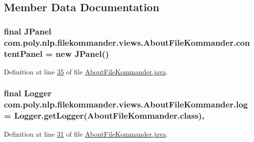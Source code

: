 \subsection{Member Data Documentation}
\hypertarget{classcom_1_1poly_1_1nlp_1_1filekommander_1_1views_1_1_about_file_kommander_ad925c308e870c6d3789d72cdec139c93}{
\subsubsection[{content\-Panel}]{\setlength{\rightskip}{0pt plus 5cm}final J\-Panel com.\-poly.\-nlp.\-filekommander.\-views.\-About\-File\-Kommander.\-content\-Panel = new J\-Panel()\hspace{0.3cm}{\ttfamily [private]}}}\label{classcom_1_1poly_1_1nlp_1_1filekommander_1_1views_1_1_about_file_kommander_ad925c308e870c6d3789d72cdec139c93}


Definition at line \hyperlink{L35}{35} of file \hyperlink{}{About\-File\-Kommander.\-java}.

\hypertarget{classcom_1_1poly_1_1nlp_1_1filekommander_1_1views_1_1_about_file_kommander_af5cbf6e6423901be93a2a580049f3728}{
\subsubsection[{log}]{\setlength{\rightskip}{0pt plus 5cm}final Logger com.\-poly.\-nlp.\-filekommander.\-views.\-About\-File\-Kommander.\-log = Logger.\-get\-Logger(About\-File\-Kommander.\-class)\hspace{0.3cm}{\ttfamily [static]}, {\ttfamily [private]}}}\label{classcom_1_1poly_1_1nlp_1_1filekommander_1_1views_1_1_about_file_kommander_af5cbf6e6423901be93a2a580049f3728}


Definition at line \hyperlink{L31}{31} of file \hyperlink{}{About\-File\-Kommander.\-java}.

